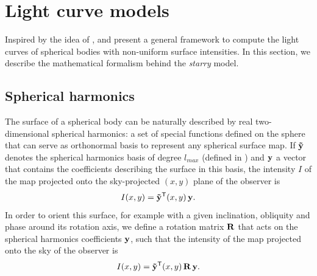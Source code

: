 \documentclass[modern]{aastex631}
\begin{document}
\section{Light curve models}\label{starry}

Inspired by the idea of \cite{pal2012}, \cite{starry} and \cite{Agol2020} present a general framework to compute the light curves of spherical bodies with non-uniform surface intensities. In this section, we describe the mathematical formalism behind the \textit{starry} model.

\subsection{Spherical harmonics}\label{SH}

The surface of a spherical body can be naturally described by real two-dimensional spherical harmonics: a set of special functions defined on the sphere that can serve as orthonormal basis to represent any spherical surface map. If ${\mathbf{\tilde y}}$ denotes the spherical harmonics basis of degree $l_{max}$ (defined in \citealt[section 2.2]{starry}) and ${\mathbf{y}}$ a vector that contains the coefficients describing the surface in this basis, the intensity $I$ of the map projected onto the sky-projected $(x, y)$ plane of the observer is
\begin{equation}\label{eq:I}I(x, y) = \bvec{\tilde y^\mathsf{T}}(x, y) \, \bvec{y}.\end{equation}
In order to orient this surface, for example with a given inclination, obliquity and phase around its rotation axis, we define a rotation matrix ${\mathbf{R}}$ that acts on the spherical harmonics coefficients ${\mathbf{y}}$, such that the intensity of the map projected onto the sky of the observer is
\begin{equation}\label{eq:IR}I(x, y) = \bvec{\tilde y}^\mathsf{T}(x, y) \, \bvec{R} \, \bvec{y}.\end{equation}\\
\end{document}
